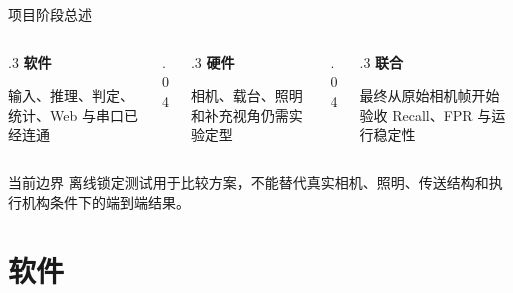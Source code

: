 \documentclass[aspectratio=169,10pt]{beamer}
\begin{document}
\begin{frame}{项目阶段总述}
  \begin{columns}[T,onlytextwidth]
    \begin{column}{.3\textwidth}
      \centering
      {\color{seugreen}\LARGE\bfseries 软件}

      \vspace{.5em}
      输入、推理、判定、统计、Web 与串口已经连通
    \end{column}
    \begin{column}{.04\textwidth}
      \centering\vspace{1.2em}{\color{seugold}\Large$+$}
    \end{column}
    \begin{column}{.3\textwidth}
      \centering
      {\color{seugreen}\LARGE\bfseries 硬件}

      \vspace{.5em}
      相机、载台、照明和补充视角仍需实验定型
    \end{column}
    \begin{column}{.04\textwidth}
      \centering\vspace{1.2em}{\color{seugold}\Large$=$}
    \end{column}
    \begin{column}{.3\textwidth}
      \centering
      {\color{seugreen}\LARGE\bfseries 联合}

      \vspace{.5em}
      最终从原始相机帧开始验收 Recall、FPR 与运行稳定性
    \end{column}
  \end{columns}

  \vfill
  \begin{alertblock}{当前边界}
    离线锁定测试用于比较方案，不能替代真实相机、照明、传送结构和执行机构条件下的端到端结果。
  \end{alertblock}
\end{frame}

\section{软件}

\end{document}
